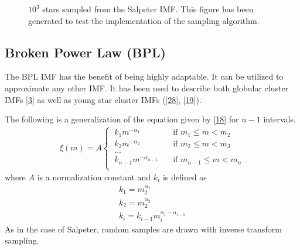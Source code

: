 \documentclass[letterpaper,10pt,english]{sphinxmanual}
\begin{document}
				\begin{figure}[htbp]
				\centering
				\capstart
				
				\noindent{}
				\caption{\(10^3\) stars sampled from the Salpeter IMF. This figure has been generated to test the implementation of the sampling algorithm.}\label{\detokenize{NBodySimulation/Initialization:id41}}\label{\detokenize{NBodySimulation/Initialization:fig-initial-conditions-mass-salpeter}}\end{figure}
		
		
			\subsection{Broken Power Law (BPL)}
				\label{\detokenize{NBodySimulation/Initialization:broken-power-law-bpl}}
				\sphinxAtStartPar
				The BPL IMF has the benefit of being highly adaptable. It can be utilized to approximate any other IMF.
				It has been used to describe both globular cluster IMFs {[}\hyperlink{cite.NBodySimulation/Appendix:id11}{3}{]} as well as young star cluster IMFs ({[}\hyperlink{cite.NBodySimulation/Appendix:id12}{28}{]}, {[}\hyperlink{cite.NBodySimulation/Appendix:id13}{19}{]}).
				
				\sphinxAtStartPar
				The following is a generalization of the equation given by {[}\hyperlink{cite.NBodySimulation/Appendix:id10}{18}{]} for \(n-1\) intervals.
				\begin{equation*}
				\begin{split}\xi(m)=A
				\begin{cases}
				    \ k_{1}m^{-\alpha_{1}} &\quad\text{if }m_{1}\leqslant m< m_{2}\\
				    \ k_{2}m^{-\alpha_{2}} &\quad\text{if }m_{2}\leqslant m< m_{3}\\
				    \ ...  \\
				    \ k_{n-1}m^{-\alpha_{n-1}} &\quad\text{if }m_{n-1}\leqslant m< m_{n}\\
				\end{cases}\end{split}
				\end{equation*}
				\sphinxAtStartPar
				where \(A\) is a normalization constant and \(k_{i}\) is defined as
				\begin{equation*}
				\begin{split}k_{1} = m_{2}^{\alpha_{1}} \\
				k_{2} = m_{2}^{\alpha_{2}} \\
				k_{i} = k_{i-1}m_{i}^{\alpha_{i}-\alpha_{i-1}}\end{split}
				\end{equation*}
				\sphinxAtStartPar
				As in the case of Salpeter, random samples are drawn with inverse transform sampling.
				
\end{document}
